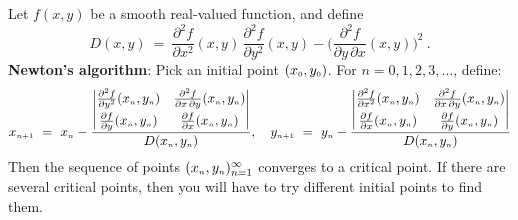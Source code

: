 Let $f(x,y)$ be a smooth real-valued function, and define
\begin{displaymath}
 D(x,y) ~=~ \dfrac{\partial^2 f}{\partial x^2}(x,y) \, \dfrac{\partial^2 f}{\partial y^2}(x,y) -
 \biggl( \dfrac{\partial^2 f}{\partial y \, \partial x}(x,y) \biggr)^2 ~.
\end{displaymath}
\textbf{Newton's algorithm}: Pick an initial point $(x_{\scriptscriptstyle 0},y_{\scriptscriptstyle 0})$. For $n = 0, 1, 2, 3, \dots$,
define:
\begin{equation}\label{eqn:newton}
 \ssub{x}{n+1} ~=~ \ssub{x}{n} -
  \frac{
    \begin{vmatrix}
     \frac{\partial^2 f}{\partial y^2}(\ssub{x}{n},\ssub{y}{n}) &
     \frac{\partial^2 f}{\partial x \, \partial y}(\ssub{x}{n},\ssub{y}{n})\vspace{1mm}\\
     \frac{\partial f}{\partial y}(\ssub{x}{n},\ssub{y}{n}) &
     \frac{\partial f}{\partial x}(\ssub{x}{n},\ssub{y}{n})
    \end{vmatrix}}{D(\ssub{x}{n},\ssub{y}{n})} ,\quad
 \ssub{y}{n+1} ~=~ \ssub{y}{n} -
  \frac{
    \begin{vmatrix}
     \frac{\partial^2 f}{\partial x^2}(\ssub{x}{n},\ssub{y}{n}) &
     \frac{\partial^2 f}{\partial x \, \partial y}(\ssub{x}{n},\ssub{y}{n})\vspace{1mm}\\
     \frac{\partial f}{\partial x}(\ssub{x}{n},\ssub{y}{n}) &
     \frac{\partial f}{\partial y}(\ssub{x}{n},\ssub{y}{n})
    \end{vmatrix}}{D(\ssub{x}{n},\ssub{y}{n})}
\end{equation}
Then the sequence of points $(x_{\scriptscriptstyle n},y_{\scriptscriptstyle n})_{n=1}^{\infty}$ converges to a critical point. If there are
several critical points, then you will have to try different initial points to find them.

